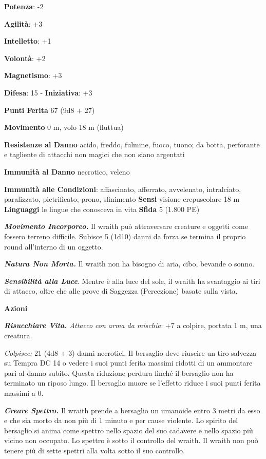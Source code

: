 \begin{multicols}{2}
\textbf{Potenza}: -2

\textbf{Agilità}: +3

\textbf{Intelletto}: +1

\textbf{Volontà}: +2

\textbf{Magnetismo}: +3

\textbf{Difesa}: 15 - \textbf{Iniziativa}: +3

\textbf{Punti Ferita} 67 (9d8 + 27)

\textbf{Movimento} 0 m, volo 18 m (fluttua)

\textbf{Resistenze al Danno} acido, freddo, fulmine, fuoco, tuono;
da botta, perforante e tagliente di attacchi non magici che non siano
argentati

\textbf{Immunità al Danno} necrotico, veleno

\textbf{Immunità alle Condizioni}: affascinato, afferrato, avvelenato,
intralciato, paralizzato, pietrificato, prono, sfinimento \textbf{Sensi}
visione crepuscolare 18 m \textbf{Linguaggi} le lingue
che conosceva in vita \textbf{Sfida} 5 (1.800 PE)\smallskip

\emph{\textbf{Movimento Incorporeo.}} Il wraith può attraversare
creature e oggetti come fossero terreno difficile. Subisce 5 (1d10)
danni da forza se termina il proprio round all'interno di un oggetto.

\emph{\textbf{Natura Non Morta.}} Il wraith non ha bisogno di aria,
cibo, bevande o sonno.

\emph{\textbf{Sensibilità alla Luce}}. Mentre è alla luce del sole, il
wraith ha svantaggio ai tiri di attacco, oltre che alle prove di
Saggezza (Percezione) basate sulla vista.

\smallskip\textbf{Azioni}

\emph{\textbf{Risucchiare Vita.} Attacco con arma da mischia}: +7 a
colpire, portata 1 m, una creatura.

\emph{Colpisce:} 21 (4d8 + 3) danni necrotici. Il bersaglio deve
riuscire un tiro salvezza su Tempra DC 14 o vedere i suoi punti
ferita massimi ridotti di un ammontare pari al danno subito. Questa
riduzione perdura finché il bersaglio non ha terminato un riposo lungo.
Il bersaglio muore se l'effetto riduce i suoi punti ferita massimi a 0.

\emph{\textbf{Creare Spettro.}} Il wraith prende a bersaglio un umanoide
entro 3 metri da esso e che sia morto da non più di 1 minuto e per cause
violente. Lo spirito del bersaglio si anima come spettro nello spazio
del suo cadavere e nello spazio più vicino non occupato. Lo spettro è
sotto il controllo del wraith. Il wraith non può tenere più di sette
spettri alla volta sotto il suo controllo.


\end{multicols}
